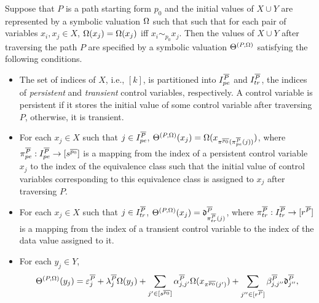 \begin{proposition}\label{prop-sum-path}
Suppose that $P$ is a path starting form $p_0$ and the initial values of $X \cup Y$ are represented by a symbolic valuation $\Omega$ such that such that for each pair of variables $x_i, x_j \in X$, $\Omega(x_j)=\Omega(x_j)$ iff $x_i \sim_{p_0} x_j$. Then the values of $X \cup Y$ after traversing the path $P$ are specified by a symbolic valuation $\Theta^{(P,\Omega)}$ satisfying the following conditions.
\begin{itemize}
\item The set of indices of $X$, i.e., $[k]$, is partitioned into $I^{\overline{P}}_{pe}$ and $I^{\overline{P}}_{tr}$, the indices of \emph{persistent} and \emph{transient} control variables, respectively. A control variable is persistent if it stores the initial value of some control variable after traversing $P$, otherwise, it is transient.
\item For each $x_j\in X$ such that $j \in I^{\overline{P}}_{pe}$, $\Theta^{(P,\Omega)}(x_j)=\Omega(x_{\pi^{\overline{p_0}}(\pi^{\overline{P}}_{pe}(j))})$, where $\pi^{\overline{P}}_{pe}: I^{\overline{P}}_{pe} \rightarrow [s^{\overline{p_0}}]$ is a mapping from the index of a persistent control variable $x_j$ to the index of the equivalence class such that the initial value of control variables corresponding to this equivalence class is assigned to $x_j$ after traversing $P$.
%
\item  For each $x_j\in X$ such that $j\in I^{\overline{P}}_{tr}$,
$\Theta^{(P,\Omega)}(x_j)=\mathfrak{d}^{\overline{P}}_{\pi^{\overline{P}}_{tr}(j)}$, where $\pi^{\overline{P}}_{tr}: I^{\overline{P}}_{tr} \rightarrow [r^{\overline{P}}]$ is a mapping from the index of a transient control variable to the index of the data value assigned to it.
% 
\item For each $y_j \in Y$, 
\[
 \Theta^{(P,\Omega)}(y_j)  =
 \varepsilon^{\overline{P}}_{j} + 
 \lambda^{\overline{P}}_j \Omega(y_j)  + 
  \sum\limits_{j'\in [s^{\overline{p_0}}]} \alpha^{\overline{P}}_{j,j'}\Omega(x_{\pi^{\overline{p_0}}(j')}) +
  \sum\limits_{j''\in [r^{\overline{P}}]}\beta^{\overline{P}}_{j,j''} \mathfrak{d}^{\overline{P}}_{j''},
\]  
\end{itemize}
\end{proposition}

